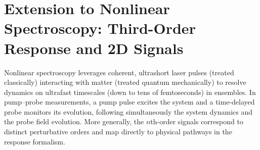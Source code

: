 \section{Extension to Nonlinear Spectroscopy: Third-Order Response and 2D Signals}
\label{final:sec:third_order}
\noindent
Nonlinear spectroscopy leverages coherent, ultrashort laser pulses (treated classically) interacting with matter (treated quantum mechanically) to resolve dynamics on ultrafast timescales (down to tens of femtoseconds) in ensembles. In pump--probe measurements, a pump pulse excites the system and a time-delayed probe monitors its evolution, following simultaneously the system dynamics and the probe field evolution. More generally, the $n$th-order signals correspond to distinct perturbative orders and map directly to physical pathways in the response formalism.

